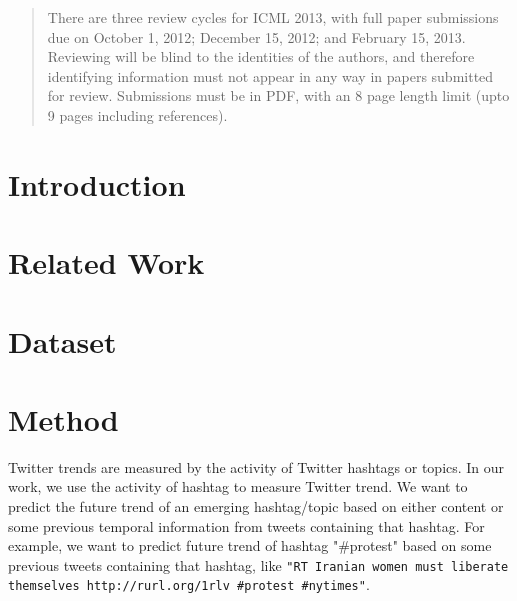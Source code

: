 \documentclass{article}
\begin{document}
 


\begin{abstract} 
There are three review cycles for ICML 2013, with full paper submissions 
due on October 1, 2012; December 15, 2012; and February 15, 2013. Reviewing 
will be blind to the identities of the authors, and therefore identifying
information must not appear in any way in papers submitted for review. 
Submissions must be in PDF, with an 8 page length limit (upto 9 pages 
including references).
\end{abstract} 

\section{Introduction}
\label{submission}



\section{Related Work} 


\section{Dataset} 


\section{Method}

Twitter trends are measured by the activity of Twitter hashtags or topics. In our work, we use the activity of hashtag to measure Twitter trend. We want to predict the future trend of an emerging hashtag/topic based on either content or some previous temporal information from tweets containing that hashtag. For example, we want to predict future trend of hashtag "\#protest" based on some previous tweets containing that hashtag, like \texttt{"RT Iranian women must liberate themselves http://rurl.org/1rlv \#protest \#nytimes"}.
\end{document}
